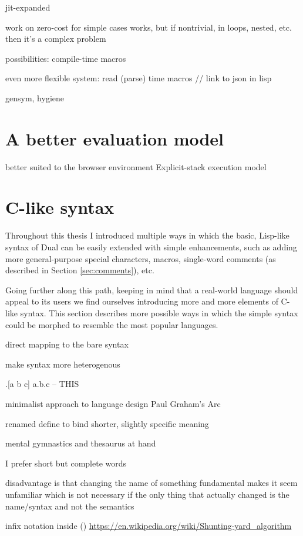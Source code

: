  jit-expanded
 
 work on zero-cost
    for simple cases works, but
    if nontrivial, in loops, nested, etc. then it's a complex problem
    
possibilities:
    compile-time macros
    
even more flexible system:
    read (parse) time macros // link to json in lisp
 
gensym, hygiene
 
 \section{A better evaluation model}
 better suited to the browser environment
 Explicit-stack execution model
 
\section{C-like syntax}
Throughout this thesis I introduced multiple ways in which the basic, Lisp-like syntax of Dual can be easily extended with simple enhancements, such as adding more general-purpose special characters, macros, single-word comments (as described in Section \ref{sec:comments}), etc.

Going further along this path, keeping in mind that a real-world language should appeal to its users 
we find ourselves introducing more and more elements of C-like syntax. This section describes more possible ways in which the simple syntax could be morphed to resemble the most popular languages.


direct mapping to the bare syntax

make syntax more heterogenous

.[a b c]
a.b.c -- THIS

minimalist approach to language design
Paul Graham's Arc

renamed define to bind
shorter, slightly specific meaning

mental gymnastics and thesaurus at hand

I prefer short but complete words

disadvantage is that changing the name of something fundamental makes it seem unfamiliar
which is not necessary if the only thing that actually changed is the name/syntax and not the semantics

infix notation inside ()
\url{https://en.wikipedia.org/wiki/Shunting-yard_algorithm}


